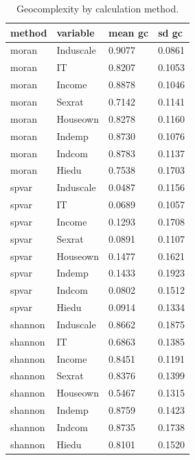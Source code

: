 \begin{table}[t]\centering
\caption{Geocomplexity by calculation method.}\label{tab:gcmethod}
\begin{tabular}{llll}
\hline
method & variable & mean gc & sd gc \\
\hline
moran & Induscale & 0.9077 & 0.0861 \\
moran & IT & 0.8207 & 0.1053 \\
moran & Income & 0.8878 & 0.1046 \\
moran & Sexrat & 0.7142 & 0.1141 \\
moran & Houseown & 0.8278 & 0.1160 \\
moran & Indemp & 0.8730 & 0.1076 \\
moran & Indcom & 0.8783 & 0.1137 \\
moran & Hiedu & 0.7538 & 0.1703 \\
spvar & Induscale & 0.0487 & 0.1156 \\
spvar & IT & 0.0689 & 0.1057 \\
spvar & Income & 0.1293 & 0.1708 \\
spvar & Sexrat & 0.0891 & 0.1107 \\
spvar & Houseown & 0.1477 & 0.1621 \\
spvar & Indemp & 0.1433 & 0.1923 \\
spvar & Indcom & 0.0802 & 0.1512 \\
spvar & Hiedu & 0.0914 & 0.1334 \\
shannon & Induscale & 0.8662 & 0.1875 \\
shannon & IT & 0.6863 & 0.1385 \\
shannon & Income & 0.8451 & 0.1191 \\
shannon & Sexrat & 0.8376 & 0.1399 \\
shannon & Houseown & 0.5467 & 0.1315 \\
shannon & Indemp & 0.8759 & 0.1423 \\
shannon & Indcom & 0.8735 & 0.1738 \\
shannon & Hiedu & 0.8101 & 0.1520 \\
\hline
\end{tabular}\end{table}
